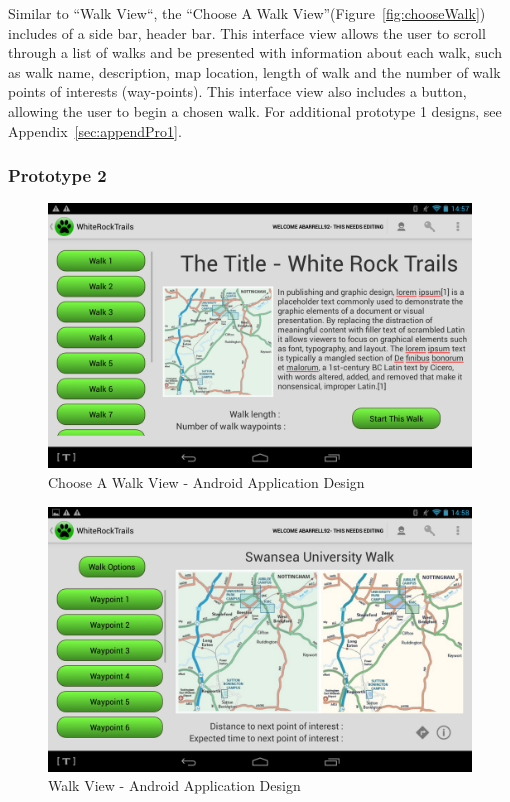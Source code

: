 \documentclass[11pt,a4paper]{article}
\begin{document}
Similar to ``Walk View``, the ``Choose A Walk View''(Figure~\ref{fig:chooseWalk}) includes of a side bar, header bar. This interface view allows the user to scroll through a list of walks and be presented with information about each walk, such as walk name, description, map location, length of walk and the number of walk points of interests (way-points). This interface view also includes a button, allowing the user to begin a chosen walk. For additional prototype 1 designs, see Appendix~\ref{sec:appendPro1}.

\subsubsection{Prototype 2}

\begin{figure}[h!]
\begin{center}
\includegraphics[width=12cm]{./img/app_choose_walk.png}
\caption{Choose A Walk View - Android Application Design}
\label{fig:appChoose}
\end{center}
\end{figure}


\begin{figure}[h!]
\begin{center}
\includegraphics[width=12cm]{./img/app_walk_view.png}
\caption{Walk View - Android Application Design}
\label{fig:appWalk}
\end{center}
\end{figure}
\end{document}
